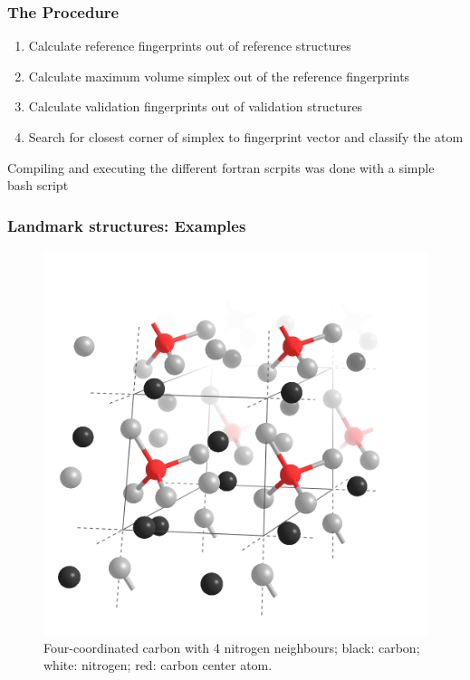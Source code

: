 \documentclass{beamer}
\begin{document}
\begin{frame}
  \frametitle{The Procedure}
  \begin{enumerate}
    \item Calculate reference fingerprints out of reference structures
    \item Calculate maximum volume simplex out of the reference fingerprints
    \item Calculate validation fingerprints out of validation structures
    \item Search for closest corner of simplex to fingerprint vector and classify the atom
  \end{enumerate}
  Compiling and executing the different fortran scrpits was done with a simple bash script
\end{frame}

\begin{frame}
  \frametitle{Landmark structures: Examples}
    \begin{figure}[h!]
    \includegraphics[scale=0.19]{Figures/landmark1.png}
    \caption{Four-coordinated carbon with 4 nitrogen neighbours; black: carbon; white: nitrogen; red: carbon center atom.}
    \label{fig:const} 
  \end{figure}
\end{frame}
\end{document}
